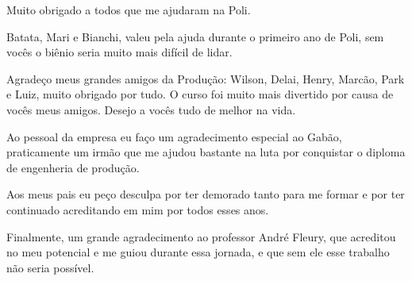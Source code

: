 \begin{agradecimentos}

Muito obrigado a todos que me ajudaram na Poli.
 
Batata, Mari e Bianchi, valeu pela ajuda durante o primeiro ano de Poli, sem vocês o biênio seria muito mais difícil de lidar.

Agradeço meus grandes amigos da Produção: Wilson, Delai, Henry, Marcão, Park e Luiz, muito obrigado por tudo. O curso foi muito mais divertido por causa de vocês meus amigos. Desejo a vocês tudo de melhor na vida.

Ao pessoal da empresa eu faço um agradecimento especial ao Gabão, praticamente um irmão que me ajudou bastante na luta por conquistar o diploma de engenheria de produção. 

Aos meus pais eu peço desculpa por ter demorado tanto para me formar e por ter continuado acreditando em mim por todos esses anos.

Finalmente, um grande agradecimento ao professor André Fleury, que acreditou no meu potencial e me guiou durante essa jornada, e que sem ele esse trabalho não seria possível.

\end{agradecimentos}
